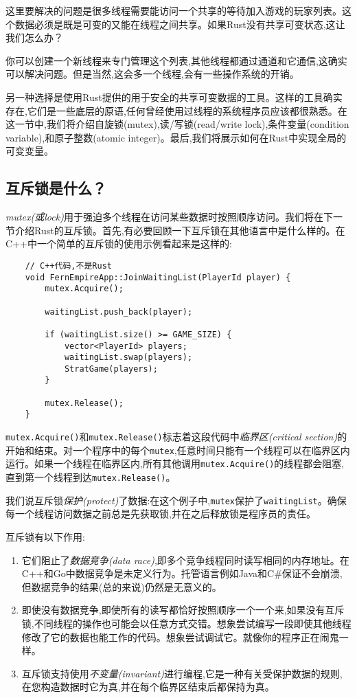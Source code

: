 这里要解决的问题是很多线程需要能访问一个共享的等待加入游戏的玩家列表。这个数据必须是既是可变的又能在线程之间共享。如果Rust没有共享可变状态,这让我们怎么办？

你可以创建一个新线程来专门管理这个列表,其他线程都通过通道和它通信,这确实可以解决问题。但是当然,这会多一个线程,会有一些操作系统的开销。

另一种选择是使用Rust提供的用于安全的共享可变数据的工具。这样的工具确实存在,它们是一些底层的原语,任何曾经使用过线程的系统程序员应该都很熟悉。在这一节中,我们将介绍自旋锁(mutex),读/写锁(read/write lock),条件变量(condition variable),和原子整数(atomic integer)。最后,我们将展示如何在Rust中实现全局的可变变量。

\subsection{互斥锁是什么？}

\emph{mutex(或lock)}用于强迫多个线程在访问某些数据时按照顺序访问。我们将在下一节介绍Rust的互斥锁。首先,有必要回顾一下互斥锁在其他语言中是什么样的。在C++中一个简单的互斥锁的使用示例看起来是这样的:
\begin{verbatim}
    // C++代码,不是Rust
    void FernEmpireApp::JoinWaitingList(PlayerId player) {
        mutex.Acquire();

        waitingList.push_back(player);

        if (waitingList.size() >= GAME_SIZE) {
            vector<PlayerId> players;
            waitingList.swap(players);
            StratGame(players);
        }

        mutex.Release();
    }
\end{verbatim}

\texttt{mutex.Acquire()}和\texttt{mutex.Release()}标志着这段代码中\emph{临界区(critical section)}的开始和结束。对一个程序中的每个\texttt{mutex},任意时间只能有一个线程可以在临界区内运行。如果一个线程在临界区内,所有其他调用\texttt{mutex.Acquire()}的线程都会阻塞,直到第一个线程到达\texttt{mutex.Release()}。

我们说互斥锁\emph{保护(protect)}了数据:在这个例子中,\texttt{mutex}保护了\texttt{waitingList}。确保每一个线程访问数据之前总是先获取锁,并在之后释放锁是程序员的责任。

互斥锁有以下作用:
\begin{enumerate}
    \item 它们阻止了\emph{数据竞争(data race)},即多个竞争线程同时读写相同的内存地址。在C++和Go中数据竞争是未定义行为。托管语言例如Java和C\#保证不会崩溃,但数据竞争的结果(总的来说)仍然是无意义的。
    \item 即使没有数据竞争,即使所有的读写都恰好按照顺序一个一个来,如果没有互斥锁,不同线程的操作也可能会以任意方式交错。想象尝试编写一段即使其他线程修改了它的数据也能工作的代码。想象尝试调试它。就像你的程序正在闹鬼一样。
    \item 互斥锁支持使用\emph{不变量(invariant)}进行编程,它是一种有关受保护数据的规则,在您构造数据时它为真,并在每个临界区结束后都保持为真。 
\end{enumerate}

